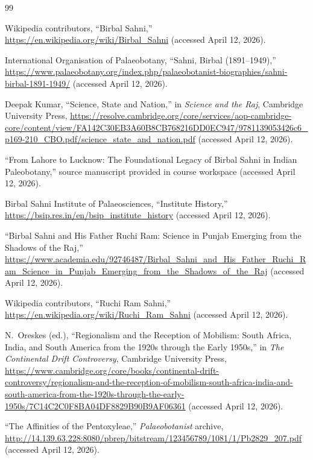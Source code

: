 \documentclass[10pt]{article}
\begin{document}
\begin{thebibliography}{99}

Wikipedia contributors, ``Birbal Sahni,''
\url{https://en.wikipedia.org/wiki/Birbal_Sahni} (accessed April 12, 2026).

International Organisation of Palaeobotany, ``Sahni, Birbal (1891--1949),''
\url{https://www.palaeobotany.org/index.php/palaeobotanist-biographies/sahni-birbal-1891-1949/} (accessed April 12, 2026).

Deepak Kumar, ``Science, State and Nation,'' in \textit{Science and the Raj},
Cambridge University Press,
\url{https://resolve.cambridge.org/core/services/aop-cambridge-core/content/view/FA142C30EB3A60B8CB768216DD0EC947/9781139053426c6_p169-210_CBO.pdf/science_state_and_nation.pdf}
(accessed April 12, 2026).

``From Lahore to Lucknow: The Foundational Legacy of Birbal Sahni in Indian
Paleobotany,'' source manuscript provided in course workspace (accessed April 12, 2026).

Birbal Sahni Institute of Palaeosciences, ``Institute History,''
\url{https://bsip.res.in/en/bsip_institute_history} (accessed April 12, 2026).

``Birbal Sahni and His Father Ruchi Ram: Science in Punjab Emerging from the
Shadows of the Raj,''
\url{https://www.academia.edu/92746487/Birbal_Sahni_and_His_Father_Ruchi_Ram_Science_in_Punjab_Emerging_from_the_Shadows_of_the_Raj}
(accessed April 12, 2026).

Wikipedia contributors, ``Ruchi Ram Sahni,''
\url{https://en.wikipedia.org/wiki/Ruchi_Ram_Sahni} (accessed April 12, 2026).

N.~Oreskes (ed.), ``Regionalism and the Reception of Mobilism: South Africa,
India, and South America from the 1920s through the Early 1950s,'' in
\textit{The Continental Drift Controversy}, Cambridge University Press,
\url{https://www.cambridge.org/core/books/continental-drift-controversy/regionalism-and-the-reception-of-mobilism-south-africa-india-and-south-america-from-the-1920s-through-the-early-1950s/7C14C2C0F8BA04DF8829B90B9AF06361}
(accessed April 12, 2026).

``The Affinities of the Pentoxyleae,'' \textit{Palaeobotanist} archive,
\url{http://14.139.63.228:8080/pbrep/bitstream/123456789/1081/1/Pb2829_207.pdf}
(accessed April 12, 2026).


\end{thebibliography}
\end{document}
